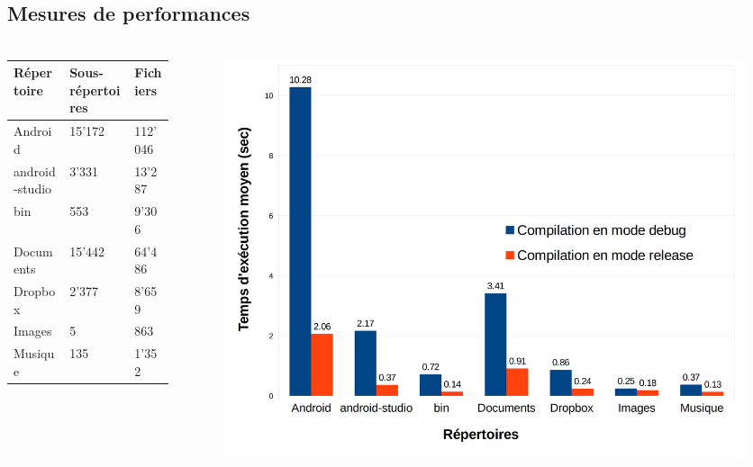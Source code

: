 \documentclass[10pt]{beamer}
\begin{document}
\subsection{Mesures de performances}
\begin{frame}
    \frametitle{\subsecname}
    \begin{columns}[T]
        \begin{column}{.35\textwidth}
        \fontsize{6pt}{8}\selectfont
            \begin{tabularx}{4cm}{|p{1cm}|p{1cm}|X|} \hline
                \textbf{Répertoire} & \textbf{Sous-répertoires} & \textbf{Fichiers} \\ \hline
                Android & 15'172 & 112'046 \\ \hline
                android-studio & 3'331 & 13'287 \\ \hline
                bin & 553 & 9'306 \\ \hline
                Documents & 15'442 & 64'486 \\ \hline
                Dropbox & 2'377 & 8'659 \\ \hline
                Images & 5 & 863 \\ \hline
                Musique & 135 & 1'352 \\ \hline
            \end{tabularx}
        \end{column}
        \pause
        \begin{column}{.65\textwidth}
            \begin{figure}
                \begin{center}
                    \includegraphics[width=1\textwidth]{images/histo.png}
                \end{center}
            \end{figure}
        \end{column}
    \end{columns}
\end{frame}
\end{document}
